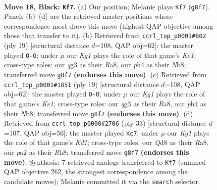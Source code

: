 \documentclass[11pt]{article}
\begin{document}
\clearpage

\begin{figure}[p]\centering
\begin{subfigure}{0.46\textwidth}\centering
\resizebox{\linewidth}{!}{%
\newchessgame
\chessboard[
  setfen={rnbqr1k1/2pn2pp/1p2p3/p2pPp2/3P1P1P/6Q1/PPPKN1P1/1R3BNR b - - 1 18},
  showmover=false,
  pgfstyle=straightmove, color=movearrow, markmove={g8-f7}
]}
\caption{}
\end{subfigure}\hfill
\begin{subfigure}{0.46\textwidth}\centering
\resizebox{\linewidth}{!}{%
\newchessgame
\chessboard[
  setfen={rn1qk2r/4ppbp/3p1np1/2pP4/4P3/2N2NP1/PP3P1P/R1BQ1K1R b kq - 2 10},
  showmover=false,
  pgfstyle=straightmove, color=movearrow, markmove={e8-g8}
]}
\caption{}
\end{subfigure}
\\[4pt]
\begin{subfigure}{0.46\textwidth}\centering
\resizebox{\linewidth}{!}{%
\newchessgame
\chessboard[
  setfen={rn1qk2r/4ppbp/3p1np1/2pP4/4P3/2N2NP1/PP3P1P/R1BQ1K1R b kq - 2 10},
  showmover=false,
  pgfstyle=straightmove, color=movearrow, markmove={e8-g8}
]}
\caption{}
\end{subfigure}\hfill
\begin{subfigure}{0.46\textwidth}\centering
\resizebox{\linewidth}{!}{%
\newchessgame
\chessboard[
  setfen={r1bk3r/3nqp1p/2pp1np1/p7/Pp1NP3/3BQ2P/1PP2PP1/2KR1N1R b - - 0 17},
  showmover=false,
  pgfstyle=straightmove, color=movearrow, markmove={d8-c7}
]}
\caption{}
\end{subfigure}
\caption{\textbf{Move 18, Black: \texttt{Kf7}.} (a) Our position; Melanie plays \texttt{Kf7} (\texttt{g8f7}). Panels (b)--(d) are the retrieved master positions whose correspondence most drove this move (highest QAP objective among those that transfer to it). (b) Retrieved from \texttt{ccrl\_top\_p0001\#802} (ply 19) [structural distance $d$=108, QAP obj=62]: the master played \texttt{O-O}; under $\mu$ our \emph{Kg1} plays the role of that game's \emph{Ke1}; cross-type roles: our \emph{q}g3 as their \emph{R}a8, our \emph{p}h4 as their \emph{N}b8; transferred move \texttt{g8f7} \textbf{(endorses this move)}. (c) Retrieved from \texttt{ccrl\_top\_p0001\#1851} (ply 19) [structural distance $d$=108, QAP obj=62]: the master played \texttt{O-O}; under $\mu$ our \emph{Kg1} plays the role of that game's \emph{Ke1}; cross-type roles: our \emph{q}g3 as their \emph{R}a8, our \emph{p}h4 as their \emph{N}b8; transferred move \texttt{g8f7} \textbf{(endorses this move)}. (d) Retrieved from \texttt{ccrl\_top\_p0000\#2706} (ply 33) [structural distance $d$=107, QAP obj=56]: the master played \texttt{Kc7}; under $\mu$ our \emph{Kg1} plays the role of that game's \emph{Kd1}; cross-type roles: our \emph{Q}d8 as their \emph{R}a8, our \emph{p}a2 as their \emph{R}h8; transferred move \texttt{g8f7} \textbf{(endorses this move)}. Synthesis: 7 retrieved analogs transferred to \texttt{Kf7} (summed QAP objective 262, the strongest correspondence among the candidate moves); Melanie committed it via the \texttt{search} selector.}
\label{fig:thought-m35}
\end{figure}
\end{document}
